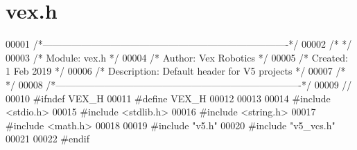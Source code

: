 \hypertarget{vex_8h_source}{}\section{vex.\+h}
\label{vex_8h_source}

\begin{DoxyCode}
00001 \textcolor{comment}{/*----------------------------------------------------------------------------*/}
00002 \textcolor{comment}{/*                                                                            */}
00003 \textcolor{comment}{/*    Module:       vex.h                                                     */}
00004 \textcolor{comment}{/*    Author:       Vex Robotics                                              */}
00005 \textcolor{comment}{/*    Created:      1 Feb 2019                                                */}
00006 \textcolor{comment}{/*    Description:  Default header for V5 projects                            */}
00007 \textcolor{comment}{/*                                                                            */}
00008 \textcolor{comment}{/*----------------------------------------------------------------------------*/}
00009 \textcolor{comment}{//}
00010 \textcolor{preprocessor}{#ifndef VEX\_H}
00011 \textcolor{preprocessor}{#define VEX\_H}
00012 
00013 
00014 \textcolor{preprocessor}{#include <stdio.h>}
00015 \textcolor{preprocessor}{#include <stdlib.h>}
00016 \textcolor{preprocessor}{#include <string.h>}
00017 \textcolor{preprocessor}{#include <math.h>}
00018 
00019 \textcolor{preprocessor}{#include "v5.h"}
00020 \textcolor{preprocessor}{#include "v5\_vcs.h"}
00021 
00022 \textcolor{preprocessor}{#endif}
\end{DoxyCode}
